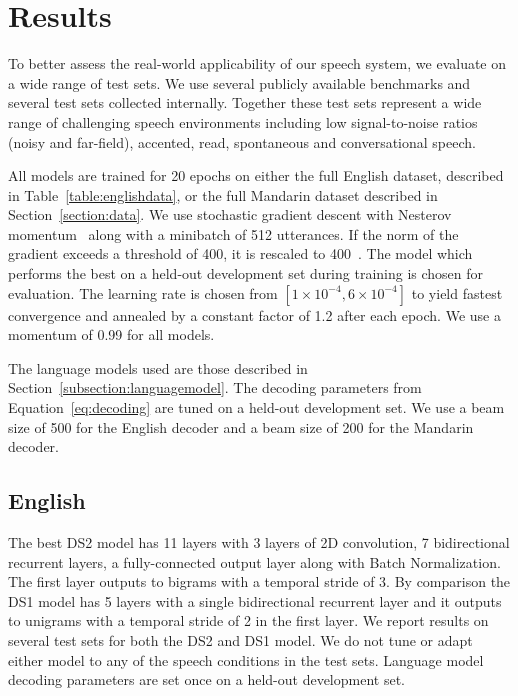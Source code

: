 \documentclass{article}
\begin{document}
\section{Results}
\label{section:results}

To better assess the real-world applicability of our speech system, we evaluate on a wide range of test sets. We use several publicly available benchmarks and several test sets collected internally. Together these test sets represent a wide range of challenging speech environments including low signal-to-noise ratios (noisy and far-field), accented, read, spontaneous and conversational speech. 

All models are trained for 20 epochs on either the full English dataset, described in Table~\ref{table:englishdata}, or the full Mandarin dataset described in Section~\ref{section:data}. We use stochastic gradient descent with Nesterov momentum~\cite{sutskever2013nag} along with a minibatch of 512 utterances. If the norm of the gradient exceeds a threshold of 400, it is rescaled to 400~\cite{pascanu2012}. The model which performs the best on a held-out development set during training is chosen for evaluation. The learning rate is chosen from $[1\times10^{-4}, 6\times10^{-4}]$ to yield fastest convergence and annealed by a constant factor of 1.2 after each epoch. We use a momentum of 0.99 for all models.

The language models used are those described in Section~\ref{subsection:languagemodel}. The decoding parameters from Equation~\ref{eq:decoding} are tuned on a held-out development set. We use a beam size of 500 for the English decoder and a beam size of 200 for the Mandarin decoder.

\subsection{English}
\label{subsection:english-results}

The best DS2 model has 11 layers with 3 layers of 2D convolution, 7 bidirectional recurrent layers, a fully-connected output layer along with Batch Normalization. The first layer outputs to bigrams with a temporal stride of 3. By comparison the DS1 model has 5 layers with a single bidirectional recurrent layer and it outputs to unigrams with a temporal stride of 2 in the first layer. We report results on several test sets for both the DS2 and DS1 model. We do not tune or adapt either model to any of the speech conditions in the test sets. Language model decoding parameters are set once on a held-out development set.
\end{document}
